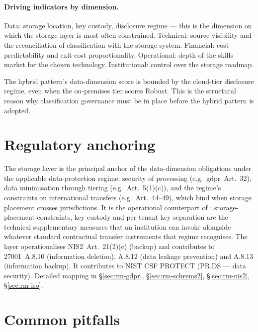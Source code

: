 \paragraph{Driving indicators by dimension.} Data: storage location,
key custody, disclosure regime --- this is the dimension on which
the storage layer is most often constrained. Technical: source
visibility and the reconciliation of classification with the
storage system. Financial: cost predictability and exit-cost
proportionality. Operational: depth of the skills market for the
chosen technology. Institutional: control over the storage
roadmap.

\noindent The hybrid pattern's data-dimension score is bounded by
the cloud-tier disclosure regime, even when the on-premises tier
scores Robust. This is the structural reason why classification
governance must be in place before the hybrid pattern is adopted.

\section{Regulatory anchoring}
\label{sec:st-regulatory}

\noindent The storage layer is the principal anchor of the
data-dimension obligations under the applicable data-protection
regime: security of processing (e.g.\ \gls{gdpr}~Art.~32), data
minimisation through tiering (e.g.\ Art.~5(1)(c)), and the regime's
constraints on international transfers (e.g.\ Art.~44--49), which bind
when storage placement crosses jurisdictions. It is the operational
counterpart of :
storage-placement constraints, key-custody and per-tenant key
separation are the technical supplementary measures that an
institution can invoke alongside whatever standard contractual
transfer instruments that regime recognises. The layer
operationalises NIS2~Art.~21(2)(c) (backup) and
contributes to 27001~A.8.10 (information deletion), A.8.12
(data leakage prevention) and A.8.13 (information backup). It
contributes to NIST CSF \textsf{PROTECT} (PR.DS --- data
security). Detailed mapping in 
\S\ref{sec:rm-gdpr}, \S\ref{sec:rm-schrems2},
\S\ref{sec:rm-nis2}, \S\ref{sec:rm-iso}.

\section{Common pitfalls}
\label{sec:st-pitfalls}


